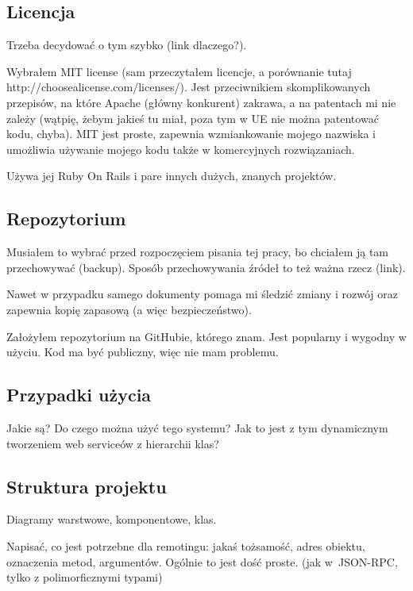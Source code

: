 \subsection{Licencja}
Trzeba decydować o tym szybko (link dlaczego?).

Wybrałem MIT license (sam przeczytałem licencje, a porównanie tutaj http://choosealicense.com/licenses/). Jest przeciwnikiem skomplikowanych przepisów, na które Apache (główny konkurent) zakrawa, a na patentach mi nie zależy (wątpię, żebym jakieś tu miał, poza tym w UE nie można patentować kodu, chyba). MIT jest proste, zapewnia wzmiankowanie mojego nazwiska i umożliwia używanie mojego kodu także w komercyjnych rozwiązaniach.

Używa jej Ruby On Rails i pare innych dużych, znanych projektów.

\subsection{Repozytorium}
Musiałem to wybrać przed rozpoczęciem pisania tej pracy, bo chciałem ją tam przechowywać (backup). Sposób przechowywania źródeł to też ważna rzecz (link).

Nawet w przypadku samego dokumenty pomaga mi śledzić zmiany i rozwój oraz zapewnia kopię zapasową (a więc bezpieczeństwo).

Założyłem repozytorium na GitHubie, którego znam. Jest popularny i wygodny w użyciu. Kod ma być publiczny, więc nie mam problemu. 




\subsection{Przypadki użycia}
Jakie są? Do czego można użyć tego systemu? Jak to jest z tym dynamicznym tworzeniem web serviceów z hierarchii klas?



\subsection{Struktura projektu}
Diagramy warstwowe, komponentowe, klas.

Napisać, co jest potrzebne dla remotingu: jakaś tożsamość, adres obiektu, oznaczenia metod, argumentów. Ogólnie to jest dość proste. (jak w~JSON-RPC, tylko z polimorficznymi typami)

